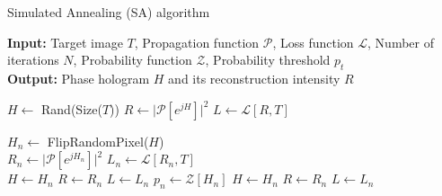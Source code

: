 \begin{algorithm}[H]
  \caption{Simulated Annealing (SA) algorithm}\label{alg:Simulated Annealing (SA) algorithm}
  \textbf{Input:} Target image $T$, Propagation function $\mathcal{P}$, Loss function $\mathcal{L}$, Number of iterations $N$, Probability function $\mathcal{Z}$, Probability threshold $p_t$ \\
  \textbf{Output:} Phase hologram $H$ and its reconstruction intensity $R$
  \begin{algorithmic}
    \State $H \gets$ Rand(Size($T$))
    \State $R \gets \vert \mathcal{P}[e^{jH}] \vert ^2$
    \State $L \gets \mathcal{L} [R, T]$

    \State $H_n \gets$ FlipRandomPixel($H$)\\
    \State $R_n \gets \vert \mathcal{P}[e^{jH_n}] \vert ^2$
    \State $L_n \gets \mathcal{L} [R_n, T]$\\
    \State $H \gets H_n$
    \State $R \gets R_n$
    \State $L \gets L_n$
    \Else
    \State $p_n \gets \mathcal{Z}[H_n]$
    \State $H \gets H_n$
    \State $R \gets R_n$
    \State $L \gets L_n$
    \EndIf
    \EndIf
    \EndFor
  \end{algorithmic}
\end{algorithm}


